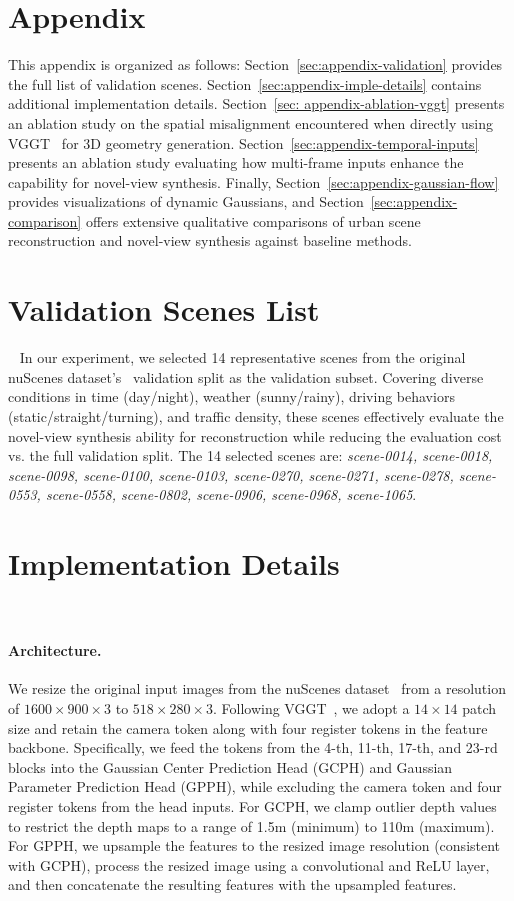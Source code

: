 \appendix
\section*{Appendix}
    This appendix is organized as follows: Section~\ref{sec:appendix-validation} provides the full list of validation scenes. Section~\ref{sec:appendix-imple-details} contains additional implementation details. Section~\ref{sec: appendix-ablation-vggt} presents an ablation study on the spatial misalignment encountered when directly using VGGT~\cite{wang2025vggt} for 3D geometry generation. Section~\ref{sec:appendix-temporal-inputs} presents an ablation study evaluating how multi-frame inputs enhance the capability for novel-view synthesis. Finally, Section~\ref{sec:appendix-gaussian-flow} provides visualizations of dynamic Gaussians, and Section~\ref{sec:appendix-comparison} offers extensive qualitative comparisons of urban scene reconstruction and novel-view synthesis against baseline methods.


\section{Validation Scenes List}~\label{sec:appendix-validation}
In our experiment, we selected 14 representative scenes from the original nuScenes dataset’s~\cite{caesar2020nuscenes} validation split as the validation subset. Covering diverse conditions in time (day/night), weather (sunny/rainy), driving behaviors (static/straight/turning), and traffic density, these scenes effectively evaluate the novel-view synthesis ability for reconstruction while reducing the evaluation cost vs. the full validation split. The 14 selected scenes are: \textit{scene-0014, scene-0018, scene-0098, scene-0100, scene-0103, scene-0270, scene-0271, scene-0278, scene-0553, scene-0558, scene-0802, scene-0906, scene-0968, scene-1065}.


\section{Implementation Details}~\label{sec:appendix-imple-details}
\paragraph{Architecture.} 
We resize the original input images from the nuScenes dataset~\cite{caesar2020nuscenes} from a resolution of \(1600\times 900\times 3\) to \(518\times 280\times 3\). Following VGGT~\cite{wang2025vggt}, we adopt a \(14\times 14\) patch size and retain the camera token along with four register tokens in the feature backbone. Specifically, we feed the tokens from the 4-th, 11-th, 17-th, and 23-rd blocks into the Gaussian Center Prediction Head (GCPH) and Gaussian Parameter Prediction Head (GPPH), while excluding the camera token and four register tokens from the head inputs. For GCPH, we clamp outlier depth values to restrict the depth maps to a range of 1.5m (minimum) to 110m (maximum). For GPPH, we upsample the features to the resized image resolution (consistent with GCPH), process the resized image using a convolutional and ReLU layer, and then concatenate the resulting features with the upsampled features.

